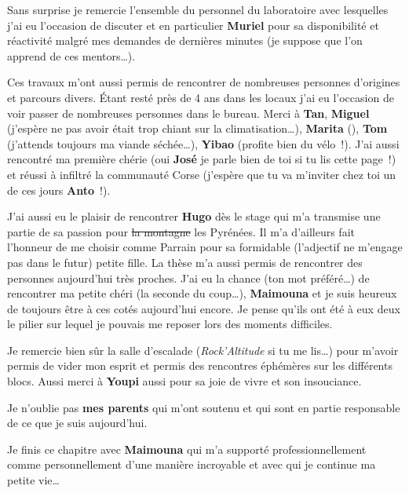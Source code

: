 Sans surprise je remercie l’ensemble du personnel du laboratoire avec lesquelles j’ai
eu l’occasion de discuter et en particulier \textbf{Muriel} pour sa disponibilité et
réactivité malgré mes demandes de dernières minutes (je suppose que l’on apprend de
ces mentors\dots).

Ces travaux m’ont aussi permis de rencontrer de nombreuses personnes d’origines et
parcours divers. Étant resté près de \num{4} ans dans les locaux j’ai eu l’occasion
de voir passer de nombreuses personnes dans le bureau. Merci à \textbf{Tan}, \textbf{Miguel} (j’espère
ne pas avoir était trop chiant sur la climatisation\dots), \textbf{Marita} (), \textbf{Tom} (j’attends
toujours ma viande séchée\dots), \textbf{Yibao} (profite bien du vélo~!). J’ai aussi rencontré
ma première chérie (oui \textbf{José} je parle bien de toi si tu lis cette page~!) et réussi
à infiltré la communauté Corse (j’espère que tu va m’inviter chez toi un de ces jours
\textbf{Anto}~!).


J’ai aussi eu le plaisir de rencontrer \textbf{Hugo} dès le stage qui m’a transmise une partie
de sa passion pour \st{la montagne} les Pyrénées. Il m’a d’ailleurs fait l’honneur
de me choisir comme Parrain pour sa formidable (l’adjectif ne m’engage pas dans le futur)
petite fille.
La thèse m’a aussi permis de rencontrer des personnes aujourd’hui très proches.
J’ai eu la chance (ton mot préféré\dots) de rencontrer ma petite chéri (la seconde
du coup\dots), \textbf{Maimouna} et je suis heureux de toujours être à ces cotés aujourd’hui encore.
Je pense qu’ils ont été à eux deux le pilier sur lequel je pouvais me reposer lors
des moments difficiles.

Je remercie bien sûr la salle d’escalade (\emph{Rock’Altitude} si tu me lis\dots) pour
m’avoir permis de vider mon esprit et permis des rencontres éphémères sur les différents
blocs. Aussi merci à \textbf{Youpi} aussi pour sa joie de vivre et son insouciance.

Je n’oublie pas \textbf{mes parents} qui m’ont soutenu et qui sont en partie responsable
de ce que je suis aujourd’hui.

Je finis ce chapitre avec \textbf{Maimouna} qui m’a supporté professionnellement comme personnellement
d’une manière incroyable et avec qui je continue ma petite vie\dots

